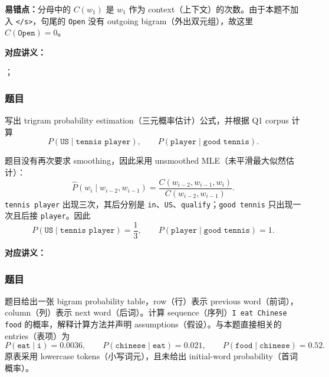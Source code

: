 \textbf{易错点：}分母中的 $C(w_1)$ 是 $w_1$ 作为 context（上下文）的次数。由于本题不加入 \texttt{</s>}，句尾的 \texttt{Open} 没有 outgoing bigram（外出双元组），故这里 $C(\texttt{Open})=0$。


\textbf{对应讲义：}\par
{}；\par
{}

\subsubsection*{题目}

写出 trigram probability estimation（三元概率估计）公式，并根据 Q1 corpus 计算
\[
  P(\texttt{US}\mid\texttt{tennis player}),
  \qquad
  P(\texttt{player}\mid\texttt{good tennis}).
\]

\begin{checkedsolution}
题目没有再次要求 smoothing，因此采用 unsmoothed MLE（未平滑最大似然估计）：
\[
  \hat P(w_i\mid w_{i-2},w_{i-1})
  =\frac{C(w_{i-2},w_{i-1},w_i)}{C(w_{i-2},w_{i-1})}.
\]
\texttt{tennis player} 出现三次，其后分别是 \texttt{in}、\texttt{US}、\texttt{qualify}；\texttt{good tennis} 只出现一次且后接 \texttt{player}。因此
\[
  \boxed{P(\texttt{US}\mid\texttt{tennis player})=\frac13},
  \qquad
  \boxed{P(\texttt{player}\mid\texttt{good tennis})=1}.
\]
\end{checkedsolution}


\textbf{对应讲义：}

\subsubsection*{题目}

题目给出一张 bigram probability table，row（行）表示 previous word（前词），column（列）表示 next word（后词）。计算 sequence（序列）\texttt{I eat Chinese food} 的概率，解释计算方法并声明 assumptions（假设）。与本题直接相关的 entries（表项）为
\[
  P(\texttt{eat}\mid\texttt{i})=0.0036,
  \qquad
  P(\texttt{chinese}\mid\texttt{eat})=0.021,
  \qquad
  P(\texttt{food}\mid\texttt{chinese})=0.52.
\]
原表采用 lowercase tokens（小写词元），且未给出 initial-word probability（首词概率）。

